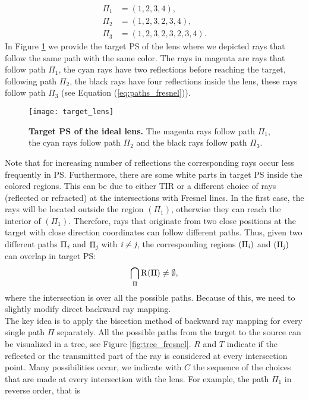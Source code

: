 \begin{equation}\label{eq:paths_fresnel}
\begin{aligned}
\Pi_1 & = (1,2,3,4),\\
\Pi_2 & = (1,2,3,2,3,4), \\
\Pi_3 & = (1,2,3,2,3,2,3,4).
\end{aligned}
\end{equation}
In Figure \ref{fig:target_PS_lens} we provide the target PS of the lens where we depicted rays that follow the same path with the same color. The rays in magenta are rays that follow path $\Pi_1$, the cyan rays have two reflections before reaching the target, following path $\Pi_2$, the black rays have four reflections inside the lens, these rays follow path $\Pi_3$ (see Equation (\ref{eq:paths_fresnel})).
\begin{figure}[t]
  \begin{center}
  \texttt{[image: target\_lens]}
  \end{center}
  \caption{\textbf{Target PS of the ideal lens.}
The magenta rays follow path $\Pi_1$, the cyan rays follow path $\Pi_2$ and the black rays follow path $\Pi_3$.}
\label{fig:target_PS_lens}
 \end{figure}
Note that for increasing number of reflections the corresponding rays occur less frequently in PS. 
Furthermore, there are some white parts in target PS inside the colored regions. 
This can be due to either TIR or a different choice of rays (reflected or refracted) at the intersections with Fresnel lines. In the first case, the rays will be located outside the region $(\Pi_1)$, otherwise they can reach the interior of $(\Pi_1)$. 
Therefore, rays that originate from two close positions at the target with close direction coordinates can follow different paths. 
Thus, given two different paths $\Pi_{\textit{i}}$ and $\Pi_{\textit{j}}$ with $\textit{i}\neq\textit{j}$, the corresponding regions $(\Pi_{\textit{i}})$ and $(\Pi_{\textit{j}})$ can overlap in target PS:
\begin{equation}
\bigcap_{\Pi}\mbox{$\textup{R}_{\textit{}}$}(\Pi)\neq \emptyset,
\end{equation}
where the intersection is over all the possible paths. 
Because of this, we need to slightly modify direct backward ray mapping. \\ \indent
The key idea is to apply the bisection method of backward ray mapping for every single path $\Pi$ separately. All the possible paths from the target to the source can be visualized in a tree, see Figure \ref{fig:tree_fresnel}. $R$ and $T$ indicate if the reflected or the transmitted part of the ray is considered at every intersection point. Many possibilities occur, we indicate with $C$ the sequence of the choices that are made at every intersection with the lens. For example, the path $\Pi_1$ in reverse order, that is 

